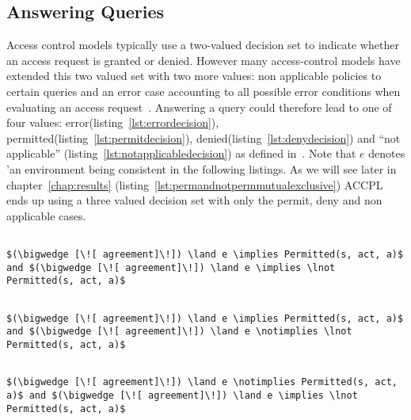 \subsection{Answering Queries}\label{subsec:answerqueriesodrl}

Access control models typically use a two-valued decision set to indicate whether an access request is granted or denied. However many access-control models have extended this two valued set with two more values: non applicable policies to certain queries and an error case accounting to all possible error conditions when evaluating an access request~\cite{DBLP:conf/sacmat/MorissetZ14}. Answering a query could therefore lead to one of four values: error(listing~\ref{lst:errordecision}), permitted(listing~\ref{lst:permitdecision}), denied(listing~\ref{lst:denydecision}) and ``not applicable'' (listing~\ref{lst:notapplicabledecision}) as defined in~\cite{Tschantz}. Note that $e$ denotes 'an environment being consistent in the following listings. As we will see later in chapter~\ref{chap:results} (listing~\ref{lst:permandnotpermmutualexclusive}) \ac{ACCPL} ends up using a three valued decision set with only the permit, deny and non applicable cases. 

\lstset{mathescape, language=AST} 
\begin{lstlisting}[frame=single, caption={Answerable Queries: Error},label={lst:errordecision}]

$(\bigwedge [\![ agreement]\!]) \land e \implies Permitted(s, act, a)$ and $(\bigwedge [\![ agreement]\!]) \land e \implies \lnot Permitted(s, act, a)$

\end{lstlisting}

\lstset{mathescape, language=AST} 
\begin{lstlisting}[frame=single, caption={Answerable Queries: Permit},label={lst:permitdecision}]

$(\bigwedge [\![ agreement]\!]) \land e \implies Permitted(s, act, a)$ and $(\bigwedge [\![ agreement]\!]) \land e \notimplies \lnot Permitted(s, act, a)$

\end{lstlisting}

\lstset{mathescape, language=AST} 
\begin{lstlisting}[frame=single, caption={Answerable Queries: Deny},label={lst:denydecision}]

$(\bigwedge [\![ agreement]\!]) \land e \notimplies Permitted(s, act, a)$ and $(\bigwedge [\![ agreement]\!]) \land e \implies \lnot Permitted(s, act, a)$

\end{lstlisting}


